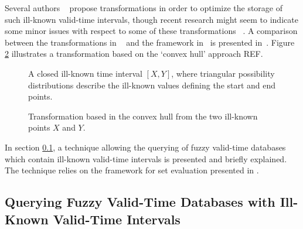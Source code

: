 
Several authors ~\cite{garrido2009} propose transformations in order to optimize the storage of such ill-known valid-time intervals, though recent research might seem to indicate some minor issues with respect to some of these transformations ~\cite{Pon11}. A comparison between the transformations in ~\cite{garrido2009} and the framework in~\cite{Pon11} is presented in~\cite{pon12}. Figure \ref{fig:convexhull} illustrates a transformation based on the `convex hull' approach REF.




\begin{figure}
\centering

\caption{A closed ill-known time interval $\left[X, Y\right]$, where triangular possibility distributions describe the ill-known values defining the start and end points.}
\label{fig:interval}
\end{figure}

\begin{figure}
\centering

\caption{Transformation based in the convex hull from the two ill-known points $X$ and $Y$. }
\label{fig:convexhull}
\end{figure}

In section \ref{subsec:querying-time-intervals}, a technique allowing the querying of fuzzy valid-time databases which contain ill-known valid-time intervals is presented and briefly explained. The technique relies on the framework for set evaluation presented in \cite{Pon11}.



\subsection{Querying Fuzzy Valid-Time Databases with Ill-Known Valid-Time Intervals}
\label{subsec:querying-time-intervals}

